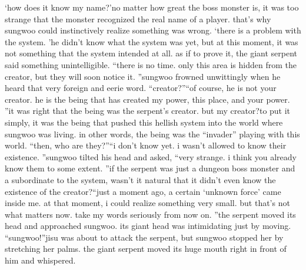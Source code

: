 ‘how does it know my name?’no matter how great the boss monster is, it was too strange that the monster recognized the real name of a player.
that’s why sungwoo could instinctively realize something was wrong.
‘there is a problem with the system.
’he didn’t know what the system was yet, but at this moment, it was not something that the system intended at all.
as if to prove it, the giant serpent said something unintelligible.
“there is no time.
 only this area is hidden from the creator, but they will soon notice it.
”sungwoo frowned unwittingly when he heard that very foreign and eerie word.
“creator?”“of course, he is not your creator.
 he is the being that has created my power, this place, and your power.
”it was right that the being was the serpent’s creator.
 but my creator?to put it simply, it was the being that pushed this hellish system into the world where sungwoo was living.
 in other words, the being was the “invader” playing with this world.
“then, who are they?”“i don’t know yet.
 i wasn’t allowed to know their existence.
”sungwoo tilted his head and asked, “very strange.
 i think you already know them to some extent.
”if the serpent was just a dungeon boss monster and a subordinate to the system, wasn’t it natural that it didn’t even know the existence of the creator?“just a moment ago, a certain ‘unknown force’ came inside me.
 at that moment, i could realize something very small.
 but that’s not what matters now.
 take my words seriously from now on.
”the serpent moved its head and approached sungwoo.
its giant head was intimidating just by moving.
“sungwoo!”jisu was about to attack the serpent, but sungwoo stopped her by stretching her palms.
 the giant serpent moved its huge mouth right in front of him and whispered.


